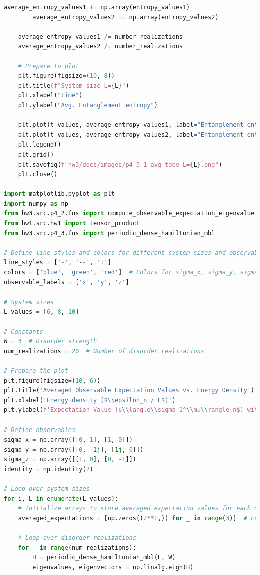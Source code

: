 \documentclass[12pt]{article}
\begin{document}
\begin{lstlisting}[language=Python]
        average_entropy_values1 += np.array(entropy_values1)
        average_entropy_values2 += np.array(entropy_values2)

    average_entropy_values1 /= number_realizations
    average_entropy_values2 /= number_realizations

    # Prepare to plot
    plt.figure(figsize=(10, 8))
    plt.title(f"System size L={L}")
    plt.xlabel("Time")
    plt.ylabel("Avg. Entanglement entropy")
    
    plt.plot(t_values, average_entropy_values1, label="Entanglement entropy for state 1")
    plt.plot(t_values, average_entropy_values2, label="Entanglement entropy for state 2")
    plt.legend()
    plt.grid()
    plt.savefig(f"hw3/docs/images/p4_3_1_avg_tdee_L={L}.png")
    plt.close()

import matplotlib.pyplot as plt
import numpy as np
from hw3.src.p4_2.fns import compute_observable_expectation_eigenvalue
from hw1.src.hw1 import tensor_product
from hw3.src.p4_3.fns import periodic_dense_hamiltonian_mbl

# Define line styles and colors for different system sizes and observables
line_styles = ['-', '--', ':']
colors = ['blue', 'green', 'red']  # Colors for sigma_x, sigma_y, sigma_z
observable_labels = ['x', 'y', 'z']

# System sizes
L_values = [6, 8, 10]

# Constants
W = 3  # Disorder strength
num_realizations = 20  # Number of disorder realizations

# Prepare the plot
plt.figure(figsize=(10, 6))
plt.title('Averaged Observable Expectation Values vs. Energy Density')
plt.xlabel('Energy density ($\\epsilon_n / L$)')
plt.ylabel(f'Expectation Value ($\\langle\\sigma_1^\\mu\\rangle_n$) with {num_realizations} realizations')

# Define observables
sigma_x = np.array([[0, 1], [1, 0]])
sigma_y = np.array([[0, -1j], [1j, 0]])
sigma_z = np.array([[1, 0], [0, -1]])
identity = np.identity(2)

# Loop over system sizes
for i, L in enumerate(L_values):
    # Initialize arrays to store averaged expectation values for each observable
    averaged_expectations = [np.zeros((2**L,)) for _ in range(3)]  # For sigma_x, sigma_y, sigma_z

    # Loop over disorder realizations
    for _ in range(num_realizations):
        H = periodic_dense_hamiltonian_mbl(L, W)
        eigenvalues, eigenvectors = np.linalg.eigh(H)


\end{lstlisting}
\end{document}
